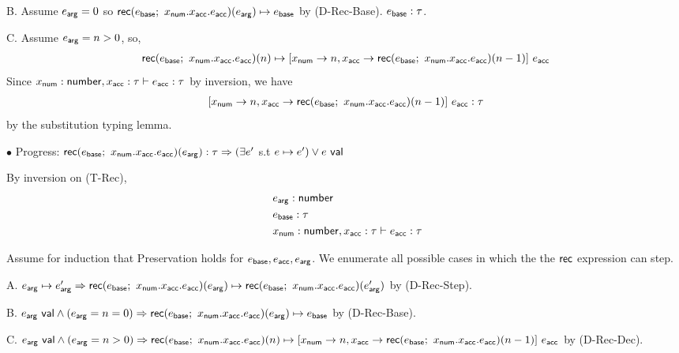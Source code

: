 \documentclass[11pt]{article}
\begin{document}
B. Assume $e_{\mathsf{arg}} = 0$ so $\mathsf{rec}(e_{\mathsf{base}}; ~ x_{\mathsf{num}}.x_{\mathsf{acc}}.e_{\mathsf{acc}})(e_{\mathsf{arg}}) \mapsto e_{\mathsf{base}}$ by (D-Rec-Base). $e_{\mathsf{base}} : \tau$. 

C. Assume $e_{\mathsf{arg}} = n > 0$, so, 
\begin{align*}
\rec{e_\msf{base}}{x_\msf{num}}{x_\msf{acc}}{e_\msf{acc}}{n} \mapsto [x_\msf{num} \rightarrow n, x_\msf{acc} \rightarrow \rec{e_\msf{base}}{x_\msf{num}}{x_\msf{acc}}{e_\msf{acc}}{n-1}] \ e_\msf{acc}
\end{align*}
Since $x_{\mathsf{num}} : \mathsf{number},x_{\mathsf{acc}} : \tau \vdash e_{\mathsf{acc}} : \tau$ by inversion, we have 
\begin{align*}
\hasType{[x_\msf{num} \rightarrow n, x_\msf{acc} \rightarrow \rec{e_\msf{base}}{x_\msf{num}}{x_\msf{acc}}{e_\msf{acc}}{n-1}] \ e_\msf{acc}}{\tau}
\end{align*}
by the substitution typing lemma. 

$\bullet$ Progress: $\mathsf{rec}(e_{\mathsf{base}}; ~ x_{\mathsf{num}}.x_{\mathsf{acc}}.e_{\mathsf{acc}})(e_{\mathsf{arg}}) : \tau \Rightarrow (\exists e'$ s.t $e \mapsto e') \lor e~\mathsf{val}$

By inversion on (T-Rec), 
\begin{align*}
&e_{\mathsf{arg}} : \mathsf{number}\\\
&e_{\mathsf{base}} : \tau\\ 
&x_{\mathsf{num}} : \mathsf{number},x_{\mathsf{acc}} : \tau \vdash e_{\mathsf{acc}} : \tau
\end{align*}

Assume for induction that Preservation holds for $e_{\mathsf{base}}, e_{\mathsf{acc}}, e_{\mathsf{arg}}$. We enumerate all possible cases in which the the $\mathsf{rec}$ expression can step. 

A. $e_{\mathsf{arg}} \mapsto e_{\mathsf{arg}}' \Rightarrow \mathsf{rec}(e_{\mathsf{base}}; ~ x_{\mathsf{num}}.x_{\mathsf{acc}}.e_{\mathsf{acc}})(e_{\mathsf{arg}}) \mapsto \mathsf{rec}(e_{\mathsf{base}}; ~ x_{\mathsf{num}}.x_{\mathsf{acc}}.e_{\mathsf{acc}})(e_{\mathsf{arg}}')$ by (D-Rec-Step). 

B. $e_{\mathsf{arg}}~\mathsf{val} \land (e_{\mathsf{arg}} = n = 0) \Rightarrow \mathsf{rec}(e_{\mathsf{base}}; ~ x_{\mathsf{num}}.x_{\mathsf{acc}}.e_{\mathsf{acc}})(e_{\mathsf{arg}}) \mapsto e_{\mathsf{base}}$ by (D-Rec-Base).

C. $\val{e_{\msf{arg}}} \land (e_{\msf{arg}} = n > 0) \Rightarrow \rec{e_\msf{base}}{x_\msf{num}}{x_\msf{acc}}{e_\msf{acc}}{n} \mapsto [x_\msf{num} \rightarrow n, x_\msf{acc} \rightarrow \rec{e_\msf{base}}{x_\msf{num}}{x_\msf{acc}}{e_\msf{acc}}{n-1}] \ e_\msf{acc}$ by (D-Rec-Dec). 
\end{document}
